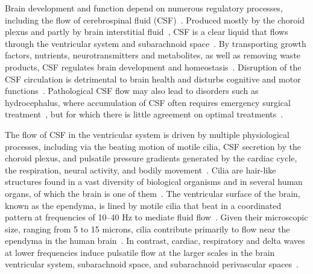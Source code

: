 \documentclass{WileyMSP-template}
\begin{document}
Brain development and function depend on numerous regulatory
processes, including the flow of cerebrospinal fluid
(CSF)~\cite{fame2020emergence}. Produced mostly by the choroid
plexus and partly by brain interstitial fluid~\cite{Brodal2016},
CSF is a clear liquid that flows through the ventricular system and subarachnoid
space~\cite{Damkier2013}. By transporting growth factors, nutrients, neurotransmitters
and metabolites, as well as removing waste products, CSF regulates
brain development and homeostasis~\cite{Ringers2020Role, fame2020emergence, del2010ependymal}.
Disruption of the CSF circulation is detrimental to brain health and disturbs
cognitive and motor functions~\cite{Johanson2008}.
Pathological CSF flow may also lead to
disorders such as hydrocephalus, where accumulation of
CSF often requires emergency surgical
treatment~\cite{duy2022rethinking, kahle2024paediatric, wallmeier2022role},
but for which there is little agreement on optimal treatments~\cite{flannery2014pediatric}. 

The flow of CSF in the ventricular system is driven by multiple
physiological processes, including via the beating motion of motile
cilia, CSF secretion by the choroid plexus, and pulsatile pressure gradients generated by the
cardiac cycle, the respiration, neural activity, and bodily
movement~\cite{Brodal2016, del2010ependymal, Ringers2020Role, Vinje2019RespiratoryMeasurements,
Kurtcuoglu2005ComputationalSystem, Olstad2019CiliaryDevelopment,
macaulay2022cerebrospinal, mestre2018flow}.
Cilia are hair-like structures found in a vast diversity of
biological organisms and in several human organs,
of which the brain is one of them~\cite{Fulford1986Muco-ciliaryLung,
Pacherres2022CiliaryProduction, Jahn1972LocomotionProtozoa,
Brennen1977FluidFlagella, Ringers2020Role, spassky2013motile,
DGama2025MotileBrain, mitchell2007evolution,
Tsukita2012CoordinatedFeet, BLAKE1974MechanicsMotion,
Reiten2017Motile-Cilia-MediatedComputations, Thouvenin2020OriginCanal}. 
The ventricular surface of the brain, known as the ependyma, is lined by
motile cilia that beat in a coordinated pattern at frequencies of
10--40 Hz to mediate fluid flow~\cite{mitchell2007evolution,
Ringers2020Role, spassky2013motile, Ringers2023NovelEpithelia, roth2025structure}. 
Given their microscopic size, ranging from
5 to 15 microns, cilia contribute primarily to flow near the
ependyma in the human brain~\cite{Siyahhan2014FlowVentricles, Olstad2019CiliaryDevelopment,
Ringers2020Role, Faubel2016Cilia-basedVentricles}. In contrast, cardiac,
respiratory and delta waves at lower frequencies induce pulsatile flow
at the larger scales in the brain ventricular system, subarachnoid space, and
subarachnoid perivascular
spaces~\cite{Vinje2019RespiratoryMeasurements, eide2024functional,
Causemann2025, fultz2019coupled, mestre2018flow, daversin2020mechanisms}.
\end{document}
